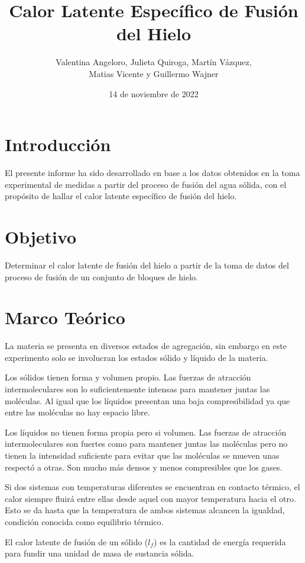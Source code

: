 \documentclass{article}
\title{Calor Latente Específico de Fusión del Hielo}
\author{Valentina Angeloro, Julieta Quiroga, Martín Vázquez, \\Matias Vicente y Guillermo Wajner}
\date{14 de noviembre de 2022}
\begin{document}
\maketitle

\section{Introducción}

El presente informe ha sido desarrollado en base a los datos obtenidos en la toma experimental de medidas a partir del proceso de fusión del agua sólida, con el propósito de hallar el calor latente específico de fusión del hielo.  

\section{Objetivo}

Determinar el calor latente de fusión del hielo a partir de la toma de datos del proceso de fusión de un conjunto de bloques de hielo.

\section{Marco Teórico}

La materia se presenta en diversos estados de agregación, sin embargo en este experimento solo se involucran los estados sólido y líquido de la materia. 

Los sólidos tienen forma y volumen propio. Las fuerzas de atracción intermoleculares son lo suficientemente intensas para mantener juntas las moléculas. Al igual que los líquidos presentan una baja compresibilidad ya que entre las moléculas no hay espacio libre.

Los líquidos no tienen forma propia pero si volumen. Las fuerzas de atracción intermoleculares son fuertes como para mantener juntas las moléculas pero no tienen la intensidad suficiente para evitar que las moléculas se mueven unas respectó a otras. Son mucho más densos y menos compresibles que los gases.

Si dos sistemas con temperaturas diferentes se encuentran en contacto térmico, el calor siempre fluirá entre ellas desde aquel con mayor temperatura hacia el otro. Esto se da hasta que la temperatura de ambos sistemas alcancen la igualdad, condición conocida como equilibrio térmico.

El calor latente de fusión de un sólido ($l_f$) es la cantidad de energía requerida para fundir una unidad de masa de sustancia sólida.
\end{document}
